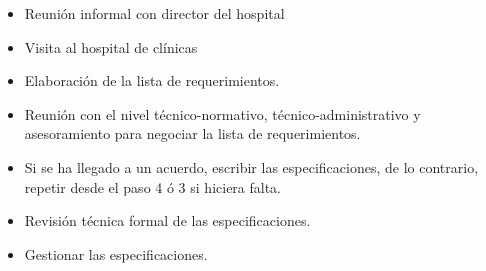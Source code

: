 \begin{itemize}
\item Reunión informal con director del hospital
\item Visita al hospital de clínicas
\item Elaboración de la lista de requerimientos.
\item Reunión con el nivel técnico-normativo, técnico-administrativo y asesoramiento para negociar la lista de requerimientos.
\item Si se ha llegado a un acuerdo, escribir las especificaciones, de lo contrario, repetir desde el paso 4 ó 3 si hiciera falta.
\item Revisión técnica formal de las especificaciones.
\item Gestionar las especificaciones.
\end{itemize}
